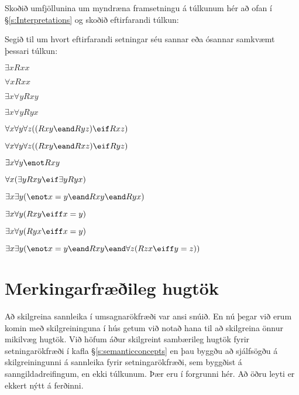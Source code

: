 \problempart
\label{pr.TorF3}
Skoðið umfjöllunina um myndræna framsetningu á túlkunum hér að ofan í \S\ref{s:Interpretations} og skoðið eftirfarandi túlkun:	
\begin{center}
\end{center}
Segið til um hvort eftirfarandi setningar séu sannar eða ósannar samkvæmt þessari túlkun:
\begin{earg}
\item $\exists x Rxx$
\item $\forall x Rxx$
\item $\exists x \forall y Rxy$
\item $\exists x \forall y Ryx$
\item $\forall x \forall y \forall z ((Rxy \eand Ryz) \eif Rxz)$
\item $\forall x \forall y \forall z ((Rxy \eand Rxz) \eif Ryz)$
\item $\exists x \forall y \enot Rxy$
\item $\forall x(\exists y Rxy \eif \exists y Ryx)$
\item $\exists x \exists y (\enot x = y \eand Rxy \eand Ryx)$
\item $\exists x \forall y(Rxy \eiff x = y)$
\item $\exists x \forall y(Ryx \eiff x = y)$
\item $\exists x \exists y(\enot x = y \eand Rxy \eand \forall z(Rzx \eiff y = z))$
\end{earg}


\chapter{Merkingarfræðileg hugtök}
Að skilgreina sannleika í umsagnarökfræði var ansi snúið. En nú þegar við erum komin með skilgreininguna í hús getum við notað hana til að skilgreina önnur mikilvæg hugtök. Við höfum áður skilgreint sambærileg hugtök fyrir setningarökfræði í kafla \S\ref{s:semanticconcepts} en þau byggðu að sjálfsögðu á skilgreiningunni á sannleika fyrir setningarökfræði, sem byggðist á sanngildadreifingum, en ekki túlkunum. Þær eru í forgrunni hér. Að öðru leyti er ekkert nýtt á ferðinni.

